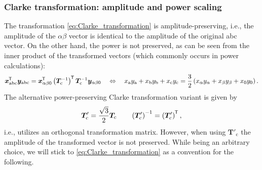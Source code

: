\begin{frame}
	\frametitle{Clarke transformation: amplitude and power scaling}
    The transformation \eqref{eq:Clarke_transformation} is amplitude-preserving, i.e., the amplitude of the $\alpha\beta$ vector is identical to the amplitude of the original abc vector. On the other hand, the power is not preserved, as can be seen from the inner product of the transformed vectors (which commonly occurs in power calculations):
    \begin{equation*}
        \bm{x}_{\mathrm{abc}}^{\mkern-1.5mu\mathsf{T}} \bm{y}_{\mathrm{abc}} = \bm{x}_\mathrm{\alpha \beta 0}^{\mkern-1.5mu\mathsf{T}}\left(\bm{T}_\mathrm{c}^{-1}\right)^{\mkern-1.5mu\mathsf{T}} \bm{T}_\mathrm{c}^{-1}\bm{y}_\mathrm{\alpha \beta 0} \quad \Leftrightarrow \quad x_\mathrm{a}y_\mathrm{a} + x_\mathrm{b}y_\mathrm{b} + x_\mathrm{c}y_\mathrm{c} = \frac{3}{2}\left(x_\alpha y_\alpha + x_\beta y_\beta + x_0 y_0 \right).
    \end{equation*}
    The alternative power-preserving Clarke transformation variant is given by
    \begin{equation}
        \renewcommand{\arraystretch}{1.2}
        \bm{T}'_\mathrm{c} = \frac{\sqrt{3}}{2} \bm{T}_\mathrm{c} \qquad \left(\bm{T}'_\mathrm{c}\right)^{-1} = \left(\bm{T}'_\mathrm{c}\right)\T,
        \label{eq:Clarke_transformation_power_preserving}
    \end{equation}
    i.e., utilizes an orthogonal transformation matrix. However, when using $\bm{T}'_\mathrm{c}$ the amplitude of the transformed vector is not preserved. While being an arbitrary choice, we will stick to \eqref{eq:Clarke_transformation} as a convention for the following. 
\end{frame}

